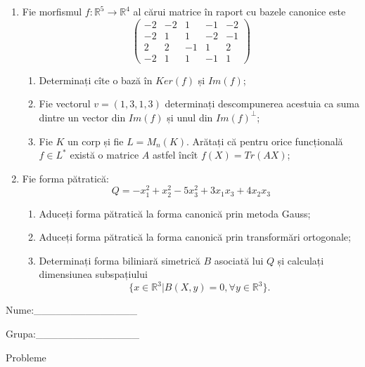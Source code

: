 \documentclass{article}
\begin{document}
\begin{enumerate}
 \item Fie morfismul $f:\mathbb{R}^5 \to \mathbb{R}^4$ al cărui matrice în raport cu bazele canonice este
$$\begin{pmatrix}
-2&-2&1&-1&-2\\
-2&1&1&-2&-1\\
2&2&-1&1&2\\
-2&1&1&-1&1
\end{pmatrix}$$

\begin{enumerate}
\item Determinați cîte o bază în $Ker(f)$ și $Im(f)$;
\item Fie vectorul $v=(1,3,1,3)$ determinați descompunerea acestuia ca suma dintre un vector din $Im(f)$ și unul din $Im(f)^\perp$;
\item Fie $K$ un corp și fie $L=M_n(K)$. Arătați că pentru orice funcțională $f \in L^*$ există o matrice $A$ astfel încît $f(X)=Tr(AX)$;
\end{enumerate}
\item Fie forma pătratică:
$$Q= -x_1^2+x_2^2-5x_3^2+3x_1x_3+4x_2x_3$$

\begin{enumerate}
\item Aduceți forma pătratică la forma canonică prin metoda Gauss;
\item Aduceți forma pătratică la forma canonică prin transformări ortogonale;
\item Determinați forma biliniară simetrică $B$ asociată lui $Q$ și calculați dimensiunea subspațiului
$$\{x \in \mathbb{R}^3 | B(X,y)=0,\forall y \in \mathbb{R}^3\}.$$

\end{enumerate}
\end{enumerate}
\newpage
\begin{flushright}
Nume:\_\_\_\_\_\_\_\_\_\_\_\_\_\_
 
 
Grupa:\_\_\_\_\_\_\_\_\_\_\_\_\_\_
\end{flushright}
\begin{center}
\vspace{2cm}
{\Large Probleme}
\vspace{2cm}
\end{center}
\end{document}

